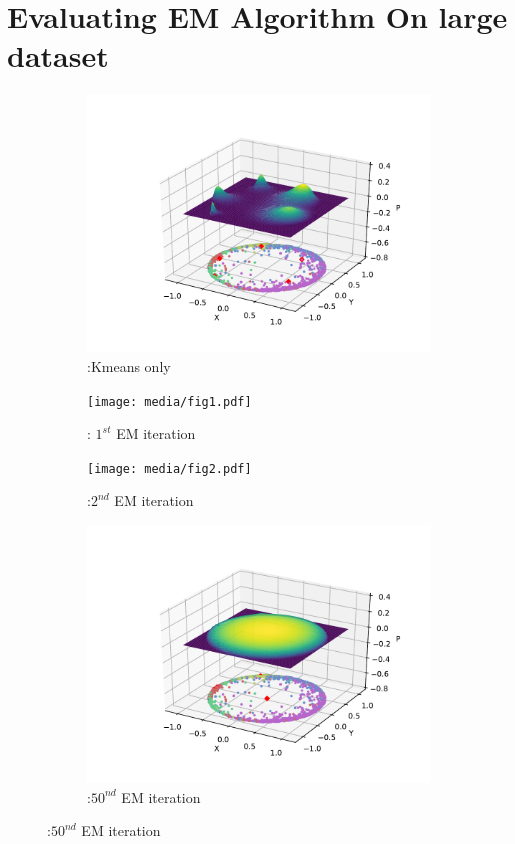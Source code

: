\documentclass{article}
\begin{document}
    \section{Evaluating EM Algorithm On large dataset}

    \begin{figure}[!ht]
        \centering
        \begin{subfigure}[b]{0.48\linewidth}
            \centering
            \includegraphics[scale=0.5]{media/fig0.pdf}
            \caption{\label{fig:n1}:Kmeans only}
        \end{subfigure}
        \begin{subfigure}[b]{0.48\linewidth}
             \centering
            \texttt{[image: media/fig1.pdf]}
            \caption{\label{fig:n2}: $1^{st}$ EM iteration}
    
        \end{subfigure}
        \begin{subfigure}[b]{0.48\linewidth}
            \centering
            \texttt{[image: media/fig2.pdf]}
            \caption{\label{fig:n1}:$2^{nd}$ EM iteration}
        \end{subfigure}
        \begin{subfigure}[b]{0.48\linewidth}
             \centering
            \includegraphics[scale=0.5]{media/fig50.pdf}
            \caption{\label{fig:n2}:$50^{nd}$ EM iteration}
    

\end{subfigure}
\end{figure}
\end{document}
